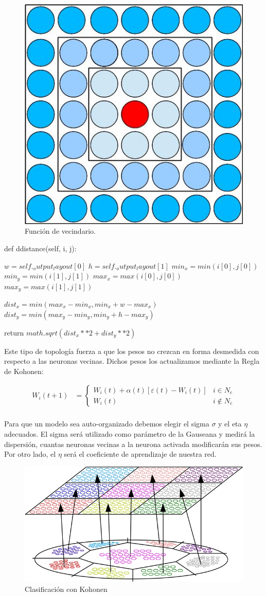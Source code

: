 \begin{figure}[ht!]
	\centering
	\includegraphics[width=0.3\linewidth]{img/parte2-vecindario.jpg}
	\caption{Función de vecindario.}
\end{figure}

\begin{algorithm}[H]
	\caption{def ddistance(self, i, j):}
	\begin{algorithmic}
		\State $w = self._output_layout[0]$
		\State $h = self._output_layout[1]$
		\State $min_x = min(i[0], j[0])$
		\State $min_y = min(i[1], j[1])$
		\State $max_x = max(i[0], j[0])$
		\State $max_y = max(i[1], j[1])$

		\State $dist_x = min(max_x-min_x, min_x + w - max_x)$
		\State $dist_y = min(max_y - min_y, min_y + h - max_y)$

		\State return $math.sqrt(dist_x**2 + dist_y**2)$
	\end{algorithmic}
\end{algorithm}

Este tipo de topología fuerza a que los pesos no crezcan en forma desmedida con respecto a las neuronas vecinas. 
Dichos pesos los actualizamos mediante la Regla de Kohonen:

\begin{align*}
	W_{i}(t+1) &=  \begin{cases}
						W_{i}(t) + \alpha(t) [ \varepsilon(t) - W_{i}(t) ] & i \in N_{c} \\
						W_{i}(t)                                           & i \not \in N_{c}  
					\end{cases} \\
\end{align*}


Para que un modelo sea auto-organizado debemos elegir el sigma $\sigma$ y  el eta $\eta$ adecuados. El sigma será 
utilizado como parámetro de la Gauseana y medirá la dispersión, cuantas neuronas vecinas a la neurona activada modificarán 
sus pesos. Por otro lado, el $\eta$ será el coeficiente de aprendizaje de nuestra red.







\begin{figure}[ht!]
	\centering
	\includegraphics[width=0.8\linewidth]{img/parte2-kohonen9clases.jpg}
	\caption{Clasificación con Kohonen}
\end{figure}

